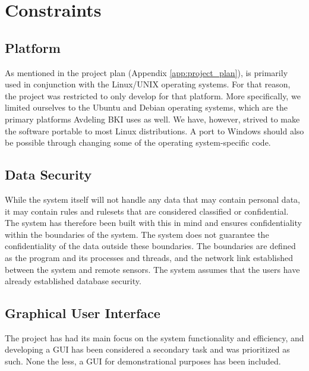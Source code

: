 \section{Constraints}

\subsection{Platform}
As mentioned in the project plan (Appendix \ref{app:project_plan}), \snort{} is
primarily used in conjunction with the Linux/UNIX operating systems. For that reason, the project was restricted to
only develop for that platform. More specifically, we limited ourselves to the
Ubuntu and Debian operating systems, which are the primary platforms Avdeling
BKI uses as well. We have, however, strived to make the software portable to
most Linux distributions. A port to Windows should also be possible through changing
some of the operating system-specific code.

\subsection{Data Security}
While the system itself will not handle any data that may contain personal data,
it may contain rules and rulesets that are considered classified or
confidential. The system has therefore been built with this in mind and ensures
confidentiality within the boundaries of the system. The system does not
guarantee the confidentiality of the data outside these boundaries. The
boundaries are defined as the program and its processes and threads, and the
network link established between the system and remote sensors. The system
assumes that the users have already established database security.

\subsection{Graphical User Interface}
The project has had its main focus on the system functionality and efficiency,
and developing a GUI has been considered a secondary task and was prioritized as
such. None the less, a GUI for demonstrational purposes has been included.
